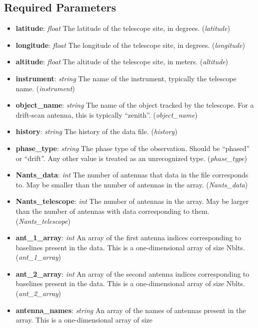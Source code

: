 \documentclass[11pt, oneside]{article}
\begin{document}
\subsection{Required Parameters}
\label{sec:req_params}
\begin{itemize}
\item \textbf{latitude}: \textit{float} The latitude of the telescope site, in
  degrees. (\textit{latitude})
\item \textbf{longitude}: \textit{float} The longitude of the telescope site, in
  degrees. (\textit{longitude})
\item \textbf{altitude}: \textit{float} The altitude of the telescope site, in
  meters. (\textit{altitude})
\item \textbf{instrument}: \textit{string} The name of the instrument, typically
  the telescope name. (\textit{instrument})
\item \textbf{object\_name}: \textit{string} The name of the object tracked by
  the telescope. For a drift-scan antenna, this is typically
  ``zenith''. (\textit{object\_name})
\item \textbf{history}: \textit{string} The history of the data
  file. (\textit{history})
\item \textbf{phase\_type}: \textit{string} The phase type of the
  observation. Should be ``phased'' or ``drift''. Any other value is treated as
  an unrecognized type. (\textit{phase\_type})
\item \textbf{Nants\_data}: \textit{int} The number of antennas that data in the
  file corresponds to. May be smaller than the number of antennas in the
  array. (\textit{Nants\_data})
\item \textbf{Nants\_telescope}: \textit{int} The number of antennas in the
  array. May be larger than the number of antennas with data corresponding to
  them. (\textit{Nants\_telescope})
\item \textbf{ant\_1\_array}: \textit{int} An array of the first antenna indices
  corresponding to baselines present in the data. This is a one-dimensional
  array of size Nblts. (\textit{ant\_1\_array})
\item \textbf{ant\_2\_array}: \textit{int} An array of the second antenna indices
  corresponding to baselines present in the data. This is a one-dimensional
  array of size Nblts. (\textit{ant\_2\_array})
\item \textbf{antenna\_names}: \textit{string} An array of the names of antennas
  present in the array. This is a one-dimensional array of size

\end{itemize}
\end{document}
